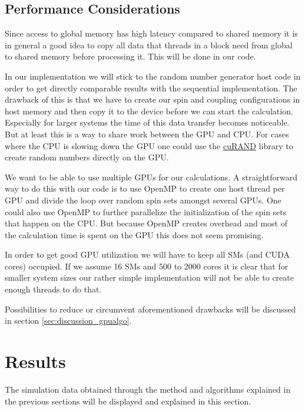 \documentclass[paper=a4, fontsize=11pt]{scrartcl} %
\numberwithin{equation}{section} %
\numberwithin{figure}{section} %
\numberwithin{table}{section} %
\begin{document}
\subsection{Performance Considerations}
Since access to global memory has high latency compared to shared memory it is in general a good idea to copy all data that threads in a block need from global to shared memory before processing it. This will be done in our code.

In our implementation we will stick to the random number generator host code in order to get directly comparable results with the sequential implementation. The drawback of this is that we have to create our spin and coupling configurations in host memory and then copy it to the device before we can start the calculation. Especially for larger systems the time of this data transfer becomes noticeable. But at least this is a way to share work between the GPU and CPU. For cases where the CPU is slowing down the GPU one could use the \href{http://docs.nvidia.com/cuda/curand/index.html}{cuRAND} library to create random numbers directly on the GPU.

We want to be able to use multiple GPUs for our calculations. A straightforward way to do this with our code is to use OpenMP to create one host thread per GPU and divide the loop over random spin sets amongst several GPUs. One could also use OpenMP to further parallelize the initialization of the spin sets that happen on the CPU. But because OpenMP creates overhead and most of the calculation time is spent on the GPU this does not seem promising.

In order to get good GPU utilization we will have to keep all SMs (and CUDA cores) occupied. If we assume 16 SMs and 500 to 2000 cores it is clear that for smaller system sizes our rather simple implementation will not be able to create enough threads to do that.

Possibilities to reduce or circumvent aforementioned drawbacks will be discussed in section \ref{sec:discussion_gpualgo}.

\section{Results}
\label{sec:results}
The simulation data obtained through the method and algorithms explained in the previous sections will be displayed and explained in this section.
\end{document}
